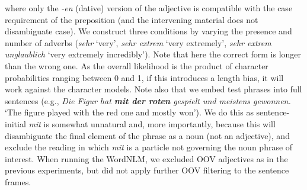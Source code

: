 where only the \emph{-en} (dative) version of the adjective is
compatible with the case requirement of the preposition (and the
intervening material does not disambiguate case). We construct three
conditions by varying the presence and number of adverbs (\emph{sehr}
`very', \emph{sehr extrem} `very extremely', \emph{sehr extrem
  unglaublich} `very extremely incredibly').  Note that here the
correct form is longer than the wrong one. As the overall likelihood
is the product of character probabilities ranging between 0 and 1, if
this introduces a length bias, it will work against the
character models. %
Note also that we embed test phrases into full sentences (e.g., \emph{Die Figur hat \textbf{mit der roten} gespielt und meistens gewonnen.} `The figure played with the red one and mostly won'). We
do this as sentence-initial \emph{mit} is somewhat unnatural and, more
importantly, because this will disambiguate the final element of the
phrase as a noun (not an adjective), and exclude the reading in which
\emph{mit} is a particle not governing the noun phrase of
interest. When running the WordNLM, we excluded OOV adjectives as in
the previous experiments, but did not apply further OOV filtering to
the sentence frames.





